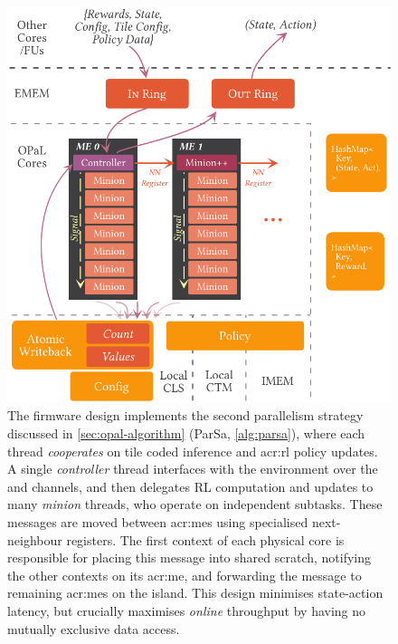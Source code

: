 \begin{figure}
	\centering
	\includegraphics[keepaspectratio, width=\linewidth]{diagrams/opal/coop}
	\caption[Architectural diagram for \approachshort{}'s \Coopfw{} firmware design.]{The \Coopfw{} firmware design implements the second parallelism strategy discussed in \cref{sec:opal-algorithm} (ParSa, \cref{alg:parsa}), where each thread \emph{cooperates}  on tile coded inference and \gls{acr:rl} policy updates. A single \emph{controller} thread interfaces with the environment over the \inring{} and \outring{} channels, and then delegates RL computation and updates to many \emph{minion} threads, who operate on independent subtasks. These messages are moved between \glspl{acr:me} using specialised next-neighbour registers. The first context of each physical core is responsible for placing this message into shared scratch, notifying the other contexts on its \gls{acr:me}, and forwarding the message to remaining \glspl{acr:me} on the island. This design minimises state-action latency, but crucially maximises \emph{online} throughput by having no mutually exclusive data access.\label{fig:single-and-parallel:parallel}}
\end{figure}

